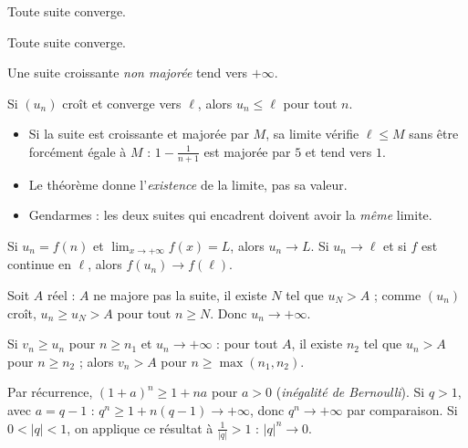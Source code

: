 \begin{paire}
\begin{theoreme}
Toute suite  converge.\par
Toute suite  converge.\par\vspace{1mm}
\par\vspace{0.6mm}
Une suite croissante \emph{non majorée} tend vers $+\infty$.\par
Si $(u_n)$ croît et converge vers $\ell$, alors $u_n\leq\ell$ pour tout $n$.
\end{theoreme}
\begin{attention}
\begin{itemize}
  \item Si la suite est croissante et majorée par $M$, sa limite vérifie \mbox{$\ell\leq M$}
    sans être forcément égale à $M$ : $1-\frac{1}{n+1}$ est majorée par $5$ et tend vers $1$.
  \item Le théorème donne l'\emph{existence} de la limite, pas sa valeur.
  \item Gendarmes : les deux suites qui encadrent doivent avoir la \emph{même} limite.
\end{itemize}
\end{attention}
\end{paire}

\begin{propriete}
Si $u_n=f(n)$ et $\displaystyle\lim_{x\to+\infty}f(x)=L$, alors $u_n\to L$. Si $u_n\to\ell$ et si
$f$ est continue en $\ell$, alors $f(u_n)\to f(\ell)$.
\end{propriete}

\begin{demonstration}
Soit $A$ réel : $A$ ne majore pas la suite, il existe $N$ tel que $u_N>A$ ; comme $(u_n)$ croît,
$u_n\geq u_N>A$ pour tout $n\geq N$. Donc $u_n\to+\infty$.\par\vspace{0.6mm}
Si $v_n\geq u_n$ pour $n\geq n_1$ et $u_n\to+\infty$ : pour tout $A$, il existe $n_2$ tel que
$u_n>A$ pour $n\geq n_2$ ; alors $v_n>A$ pour $n\geq\max(n_1,n_2)$.\par\vspace{0.6mm}
Par récurrence, $(1+a)^{n}\geq1+na$ pour $a>0$ (\emph{inégalité de Bernoulli}). Si $q>1$, avec
$a=q-1$ : $q^{n}\geq1+n(q-1)\to+\infty$, donc $q^{n}\to+\infty$ par comparaison. Si $0<|q|<1$,
on applique ce résultat à $\frac{1}{|q|}>1$ : $|q|^{n}\to0$.
\end{demonstration}

